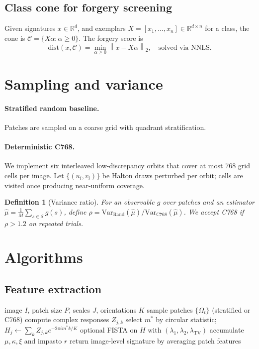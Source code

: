\documentclass[11pt]{article}
\newtheorem{definition}{Definition}
\newcommand{\R}{\mathbb{R}}
\newcommand{\norm}[1]{\left\lVert #1 \right\rVert}
\begin{document}
\subsection{Class cone for forgery screening}
Given signatures $x\in\R^d$, and exemplars $X=[x_1,\dots,x_n]\in\R^{d\times n}$ for a class, the cone is $\mathcal{C}=\{X\alpha: \alpha\ge 0\}$. The forgery score is
\begin{equation}
\mathrm{dist}(x,\mathcal{C})=\min_{\alpha\ge 0}\norm{x-X\alpha}_2,\quad \text{solved via NNLS}.
\end{equation}

\section{Sampling and variance}
\paragraph{Stratified random baseline.} Patches are sampled on a coarse grid with quadrant stratification.

\paragraph{Deterministic C768.} We implement six interleaved low-discrepancy orbits that cover at most 768 grid cells per image. Let $\{(u_i,v_i)\}$ be Halton draws perturbed per orbit; cells are visited once producing near-uniform coverage.

\begin{definition}[Variance ratio]
For an observable $g$ over patches and an estimator $\hat\mu=\frac{1}{M}\sum_{s\in \mathcal{S}} g(s)$, define $\rho=\mathrm{Var}_{\text{Rand}}(\hat\mu) / \mathrm{Var}_{\text{C768}}(\hat\mu)$. We accept C768 if $\rho>1.2$ on repeated trials.
\end{definition}

\section{Algorithms}
\subsection{Feature extraction}
\begin{algorithm}[H]
\caption{Phase-aware feature extraction}
\begin{algorithmic}[1]
\Require image $I$, patch size $P$, scales $J$, orientations $K$
\State sample patches $\{\Omega_t\}$ (stratified or C768)
  \State compute complex responses $Z_{j,k}$
  \State select $m^*$ by circular statistic; $H_j\leftarrow\sum_k Z_{j,k}e^{-2\pi i m^*k/K}$
  \State optional FISTA on $H$ with $(\lambda_1,\lambda_2,\lambda_{\mathrm{TV}})$
  \State accumulate $\mu,\kappa,\xi$ and impasto $r$
\EndFor
\State return image-level signature by averaging patch features
\end{algorithmic}
\end{algorithm}
\end{document}
